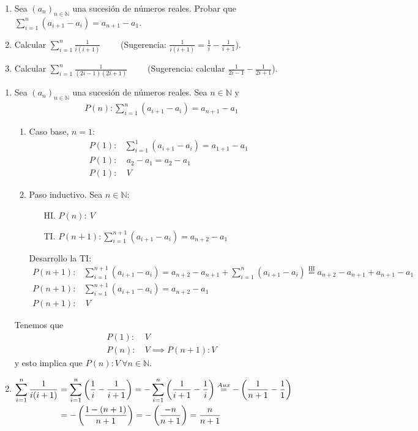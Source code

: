\ejercicio
\begin{enumerate}[label=\roman*)]
\item Sea $(a_n)_{n \in \mathbb{N}}$ una sucesión de números reales. Probar que $\displaystyle \sum^{n}_{i=1}(a_{i+1} - a_{i}) = a_{n+1} - a_{1}$.
\item Calcular $\displaystyle \sum^{n}_{i=1} \frac{1}{i(i+1)}$ \ \ \ \ (Sugerencia: $\displaystyle \frac{1}{i(i+1)} = \frac{1}{i} - \frac{1}{i+1}$).
\item Calcular $\displaystyle \sum^{n}_{i=1}\frac{1}{(2i-1)(2i+1)}$ \ \ \ \ (Sugerencia: calcular $\displaystyle \frac{1}{2i-1} - \frac{1}{2i+1}$).
\end{enumerate}
\begin{enumerate}[label=\roman*)]
\item Sea $(a_n)_{n \in \mathbb{N}}$ una sucesión de números reales. Sea $n \in \mathbb{N}$ y
\begin{align*}
P(n): \sum^{n}_{i=1}(a_{i+1} - a_{i}) = a_{n+1} - a_{1}
\end{align*}
\begin{enumerate}[label=\arabic*)]
\item Caso base, $ n = 1$:
\begin{align*}
P(1):& \sum^{1}_{i=1}(a_{i+1} - a_{i}) = a_{1+1} - a_{1} \\
P(1):& \ a_{2} - a_{1} = a_{2} - a_{1} \\
P(1):& \ V
\end{align*}
\item Paso inductivo. Sea $n \in \mathbb{N}$:
\begin{enumerate}
\item[HI.] $P(n): \ V$
\item[TI.] $ P(n+1): \displaystyle \sum^{n+1}_{i=1}(a_{i+1} - a_{i}) = a_{n+2} - a_{1} $
\end{enumerate}
Desarrollo la TI:
\begin{align*}
P(n+1):& \sum^{n+1}_{i=1}(a_{i+1} - a_{i}) = a_{n+2} - a_{n+1} + \sum^{n}_{i=1}(a_{i+1} - a_{i}) \overset{\mathrm{HI}}{=} a_{n+2} - a_{n+1} + a_{n+1} - a_{1} \\
P(n+1):& \sum^{n+1}_{i=1}(a_{i+1} - a_{i}) = a_{n+2} - a_{1} \\
P(n+1):& \ V
\end{align*}
\end{enumerate}
Tenemos que
\begin{align*}
P(1):& \ V \\
P(n):& \ V \implies P(n+1):V
\end{align*}
y esto implica que $P(n): V \ \forall n \in \mathbb{N}$.
\item $\displaystyle \sum^{n}_{i=1} \frac{1}{i(i+1)} = \sum^{n}_{i=1} \left(\frac{1}{i}- \frac{1}{i+1}\right) = - \sum^{n}_{i=1} \left(\frac{1}{i+1}-\frac{1}{i} \right) \overset{Aux}{=} - \left(\frac{1}{n+1}-\frac{1}{1}\right) \\$ 
$ \text{\phantom{$\displaystyle \sum^{n}_{i=1} \frac{1}{i(i+1)}$}}  = \displaystyle - \left(\frac{1-(n+1)}{n+1}\right) = - \left(\frac{-n}{n+1}\right) = \frac{n}{n+1}$

\end{enumerate}
